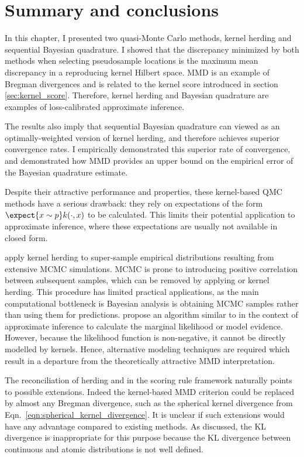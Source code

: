 \section{Summary and conclusions}

In this chapter, I presented two quasi-Monte Carlo methods, kernel herding and sequential Bayesian quadrature. I showed that the discrepancy minimized by both methods when selecting pseudosample locations is the maximum mean discrepancy in a reproducing kernel Hilbert space. MMD is an example of Bregman divergences and is related to the kernel score introduced in section \ref{sec:kernel_score}. Therefore, kernel herding and Bayesian quadrature are examples of loss-calibrated approximate inference.

The results also imply that sequential Bayesian quadrature can viewed as an optimally-weighted version of kernel herding, and therefore achieves superior convergence rates. I empirically demonstrated this superior rate of convergence, and demonstrated how MMD provides an upper bound on the empirical error of the Bayesian quadrature estimate.

Despite their attractive performance and properties, these kernel-based QMC methods have a serious drawback: they rely on expectations of the form $\expect{x\sim p} k(\cdot,x)$ to be calculated. This limits their potential application to approximate inference, where these expectations are usually not available in closed form.

\citet{Chen2010} apply kernel herding to super-sample empirical distributions resulting from extensive MCMC simulations. MCMC is prone to introducing positive correlation between subsequent samples, which can be removed by applying \sbq{} or kernel herding. This procedure has limited practical applications, as the main computational bottleneck is Bayesian analysis is obtaining MCMC samples rather than using them for predictions. \citet{Osborne2012} propose an algorithm similar to \sbq{} in the context of approximate inference to calculate the marginal likelihood or model evidence. However, because the likelihood function is non-negative, it cannot be directly modelled by kernels. Hence, alternative modeling techniques are required which result in a departure from the theoretically attractive MMD interpretation.

The reconciliation of herding and \bq{} in the scoring rule framework naturally points to possible extensions. Indeed the kernel-based MMD criterion could be replaced by almost any Bregman divergence, such as the spherical kernel divergence from Eqn.\ \ref{eqn:spherical_kernel_divergence}. It is unclear if such extensions would have any advantage compared to existing methods. As discussed, the KL divergence is inappropriate for this purpose because the KL divergence between continuous and atomic distributions is not well defined.

